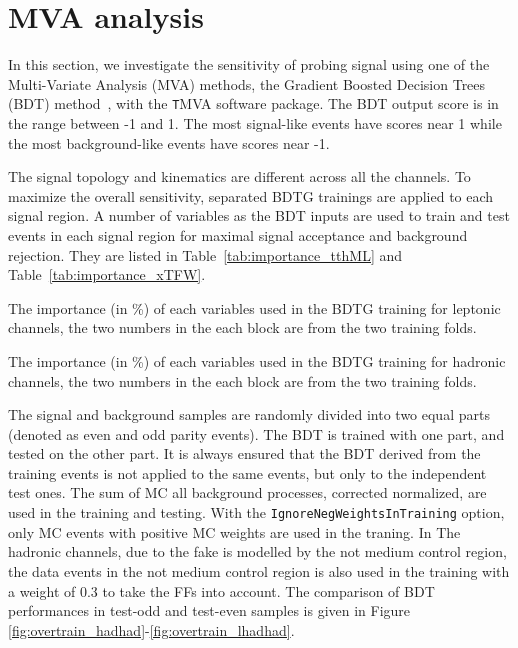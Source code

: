 \section{MVA analysis}
\label{sec:mva}

In this section, we investigate the sensitivity of probing signal using one of the Multi-Variate Analysis (MVA) methods, the Gradient Boosted Decision Trees (BDT) method~\cite{BDT,BDT2}, with the {\texttt TMVA} software package. The BDT output score is in the range between -1 and 1. The most signal-like events have scores near 1 while the most background-like events have scores near -1.

The signal topology and kinematics are different across all the channels. To maximize the overall sensitivity, separated BDTG trainings are applied to each signal region. A number of variables as the BDT inputs are used to train and test events in each signal region for maximal signal acceptance and background rejection. They are listed in Table~\ref{tab:importance_tthML} and Table~\ref{tab:importance_xTFW}. 

\begin{table}
\caption{The importance (in \%) of each variables used in the BDTG training for leptonic channels, the two numbers in the each block are from the two training folds.}
\label{tab:importance_tthML}

\end{table}


\begin{table}
\caption{The importance (in \%) of each variables used in the BDTG training for hadronic channels, the two numbers in the each block are from the two training folds.}
\label{tab:importance_xTFW}

\end{table}

The signal and background samples are randomly divided into two equal parts (denoted as even and odd parity events). The BDT is trained with one part, and tested on the other part. It is always ensured that the BDT derived from the training events is not applied to the same events, but only to the independent test ones. The sum of MC all background processes, corrected normalized, are used in the training and testing. %
With the \texttt{IgnoreNegWeightsInTraining} option, only MC events with positive MC weights are used in the traning. In The hadronic channels, due to the fake is modelled by the not medium control region, the data events in the not medium control region is also used in the training with a weight of 0.3 to take the FFs into account. The comparison of BDT performances in test-odd and test-even samples is given in Figure \ref{fig:overtrain_hadhad}-\ref{fig:overtrain_lhadhad}.

